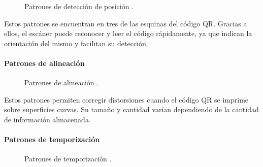 \begin{figure}[htbp]
	\begin{center}
		\caption{Patrones de detección de posición \cite{CitaA01}.}
		\label{fig:PatronesDeDeteccion}
	\end{center}
\end{figure}

Estos patrones se encuentran en tres de las esquinas del código QR. Gracias a ellos, el escáner puede reconocer y leer el código rápidamente, ya que indican la orientación del mismo y facilitan su detección.

\paragraph{Patrones de alineación}

\begin{figure}[htbp]
	\begin{center}
		\caption{Patrones de alineación \cite{CitaA01}.}
		\label{fig:PatronesAlineacion}
	\end{center}
\end{figure}

Estos patrones permiten corregir distorsiones cuando el código QR se imprime sobre superficies curvas. Su tamaño y cantidad varían dependiendo de la cantidad de información almacenada.

\paragraph{Patrones de temporización}

\begin{figure}[htbp]
	\begin{center}
		\caption{Patrones de temporización \cite{CitaA01}.}
		\label{fig:Temporizacion}
	\end{center}
\end{figure}

